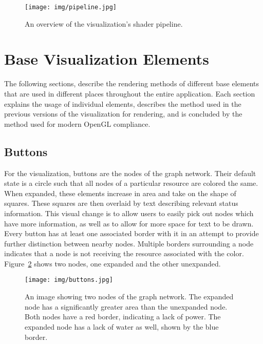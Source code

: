 \begin{figure}[htp] \centering
    \texttt{[image: img/pipeline.jpg]}
    \caption[Infrastructure Visualization Shader Pipeline]{An overview of the visualization's shader pipeline.}
    \label{fig:shader_pipeline}
\end{figure}

\section{Base Visualization Elements}
\label{section:base_mapview_elements}

The following sections, describe the rendering methods of different base elements that are used in different places throughout the entire application. Each section explains the usage of individual elements, describes the method used in the previous versions of the visualization for rendering, and is concluded by the method used for modern OpenGL compliance.

\subsection{Buttons}
\label{subsection:buttons}
For the visualization, buttons are the nodes of the graph network. Their default state is a circle such that all nodes of a particular resource are colored the same. When expanded, these elements increase in area and take on the shape of squares. These squares are then overlaid by text describing relevant status information. This visual change is to allow users to easily pick out nodes which have more information, as well as to allow for more space for text to be drawn. Every button has at least one associated border
with it in an attempt to provide further distinction between nearby nodes. Multiple borders surrounding a node indicates that a node is not receiving the resource associated with the color. Figure~\ref{fig:buttons} shows two nodes, one expanded and the other unexpanded.

\begin{figure}[htp] \centering
    \texttt{[image: img/buttons.jpg]}
    \caption[Buttons]{An image showing two nodes of the graph network. The expanded node has a significantly greater area than the unexpanded node. Both nodes have a red border, indicating a lack of power. The expanded node has a lack of water as well, shown by the blue border.}
    \label{fig:buttons}
\end{figure}

